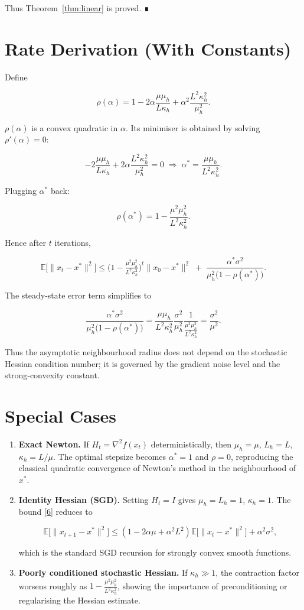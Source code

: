 \documentclass{article}
\newcommand{\E}{\mathbb{E}}
\begin{document}
Thus Theorem~\ref{thm:linear} is proved. ∎

\section*{Rate Derivation (With Constants)}
Define  

\[
\rho(\alpha)=1-2\alpha\frac{\mu\mu_{h}}{L\kappa_{h}}
            +\alpha^{2}\frac{L^{2}\kappa_{h}^{2}}{\mu_{h}^{2}} .
\]

$\rho(\alpha)$ is a convex quadratic in $\alpha$. Its minimiser is obtained by solving $\rho'(\alpha)=0$:

\[
-2\frac{\mu\mu_{h}}{L\kappa_{h}}
   +2\alpha\frac{L^{2}\kappa_{h}^{2}}{\mu_{h}^{2}}=0
\;\Longrightarrow\;
\alpha^{*}= \frac{\mu\mu_{h}}{L^{2}\kappa_{h}^{2}} .
\]

Plugging $\alpha^{*}$ back:

\[
\rho(\alpha^{*})
=1-\frac{\mu^{2}\mu_{h}^{2}}{L^{2}\kappa_{h}^{2}} .
\]

Hence after $t$ iterations,

\[
\E\!\bigl[\|x_{t}-x^{*}\|^{2}\bigr]
\le
\bigl(1-\tfrac{\mu^{2}\mu_{h}^{2}}{L^{2}\kappa_{h}^{2}}\bigr)^{t}
\|x_{0}-x^{*}\|^{2}
\;+\;
\frac{\alpha^{*}\sigma^{2}}{\mu_{h}^{2}\bigl(1-\rho(\alpha^{*})\bigr)} .
\]

The steady‑state error term simplifies to  

\[
\frac{\alpha^{*}\sigma^{2}}{\mu_{h}^{2}\bigl(1-\rho(\alpha^{*})\bigr)}
= \frac{\mu\mu_{h}}{L^{2}\kappa_{h}^{2}}
   \frac{\sigma^{2}}{\mu_{h}^{2}}
   \frac{1}{\frac{\mu^{2}\mu_{h}^{2}}{L^{2}\kappa_{h}^{2}}}
= \frac{\sigma^{2}}{\mu^{2}} .
\]

Thus the asymptotic neighbourhood radius does not depend on the stochastic Hessian condition number; it is governed by the gradient noise level and the strong‑convexity constant.

\section*{Special Cases}
\begin{enumerate}[leftmargin=*]
\item \textbf{Exact Newton.} If $H_t=\nabla^{2}f(x_t)$ deterministically, then $\mu_{h}=\mu$, $L_{h}=L$, $\kappa_{h}=L/\mu$.  The optimal stepsize becomes $\alpha^{*}=1$ and $\rho=0$, reproducing the classical quadratic convergence of Newton’s method in the neighbourhood of $x^{*}$.
\item \textbf{Identity Hessian (SGD).} Setting $H_t=I$ gives $\mu_{h}=L_{h}=1$, $\kappa_{h}=1$.  The bound \eqref{6} reduces to  

\[
\E\!\bigl[\|x_{t+1}-x^{*}\|^{2}\bigr]
\le (1-2\alpha\mu+\alpha^{2}L^{2})\E\!\bigl[\|x_{t}-x^{*}\|^{2}\bigr]
   +\alpha^{2}\sigma^{2},
\]

which is the standard SGD recursion for strongly convex smooth functions.
\item \textbf{Poorly conditioned stochastic Hessian.} If $\kappa_{h}\gg 1$, the contraction factor worsens roughly as $1-\frac{\mu^{2}\mu_{h}^{2}}{L^{2}\kappa_{h}^{2}}$, showing the importance of preconditioning or regularising the Hessian estimate.
\end{enumerate}
\end{document}
